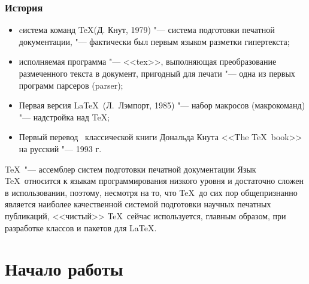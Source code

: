 \documentclass[%
10pt,
pdf,
intlimits,
sumlimits,
namelimits,
fleqn,
russian,
noamsthm,
hyperref={unicode},
utf8,
usepdftitle={false}, %
\ifdefined\aspectXVIxIX
aspectratio=169,
\else\fi
\ifdefined\printable
handout,
\else\fi
]{beamer}
\begin{document}
\begin{frame}[squeeze]
   \frametitle{История}
	{\footnotesize
		\begin{itemize}
 			\item cистема команд \TeX (Д. Кнут, 1979) "--- система подготовки печатной документации, "--- фактически был первым языком разметки гипертекста;
 			\item исполняемая программа "--- <<tex>>, выполняющая преобразование размеченного текста в документ, пригодный для печати "--- одна из первых программ парсеров (parser);
 			\item Первая версия \LaTeX\ (Л.~Лэмпорт, 1985) "--- набор макросов (макрокоманд) "--- надстройка над \TeX;
 			\item Первый перевод~\cite{knut:book:1993:01} классической книги Дональда Кнута <<The \TeX\ book>>~\cite{knut:book:1984:01} на русский "--- 1993 г.
 		\end{itemize}
 		\begin{block}{\TeX\ "--- ассемблер систем подготовки печатной документации}
 			\label{block:tex_eto_assembler_sistem_podgotovki_pechatnoj_dokumentacii}
 			Язык \TeX\ относится к языкам программирования низкого уровня и достаточно сложен в использовании, поэтому, несмотря на то, что \TeX\ до сих пор общепризнанно является наиболее качественной системой подготовки научных печатных публикаций, <<чистый>> \TeX\ сейчас используется, главным образом, при разработке классов и пакетов для \LaTeX.
 		\end{block}
   }
\end{frame}



\section{Начало работы}
\label{sec:nachalo_raboty}
\end{document}
